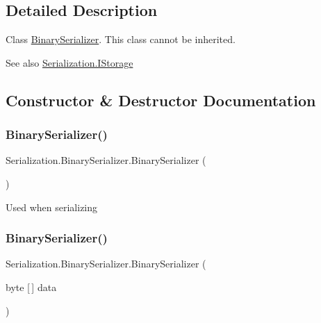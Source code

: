 \subsection{Detailed Description}
Class \hyperlink{class_serialization_1_1_binary_serializer}{Binary\+Serializer}. This class cannot be inherited. 

\begin{DoxySeeAlso}{See also}
\hyperlink{interface_serialization_1_1_i_storage}{Serialization.\+I\+Storage}


\end{DoxySeeAlso}


\subsection{Constructor \& Destructor Documentation}
\mbox{\label{class_serialization_1_1_binary_serializer_ae554963a22e35f96cd09c44b33a8370f}} 
\subsubsection{\texorpdfstring{Binary\+Serializer()}{BinarySerializer()}\hspace{0.1cm}{\footnotesize\ttfamily [1/2]}}
{\footnotesize\ttfamily Serialization.\+Binary\+Serializer.\+Binary\+Serializer (\begin{DoxyParamCaption}{ }\end{DoxyParamCaption})\hspace{0.3cm}{\ttfamily [inline]}}



Used when serializing 

\mbox{\label{class_serialization_1_1_binary_serializer_a28b39ec2276e718a01c09401054e9160}} 
\subsubsection{\texorpdfstring{Binary\+Serializer()}{BinarySerializer()}\hspace{0.1cm}{\footnotesize\ttfamily [2/2]}}
{\footnotesize\ttfamily Serialization.\+Binary\+Serializer.\+Binary\+Serializer (\begin{DoxyParamCaption}\item[{byte \mbox{[}$\,$\mbox{]}}]{data }\end{DoxyParamCaption})\hspace{0.3cm}{\ttfamily [inline]}}



